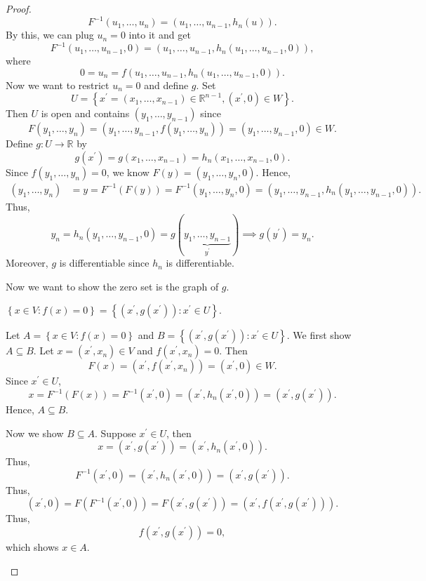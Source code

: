\begin{proof}
    \[
        F^{-1}(u_1, \dots , u_n) = (u_1, \dots , u_{n-1}, h_n(u)).
    \]         
    By this, we can plug \(u_n = 0\) into it and get 
    \[
        F^{-1}(u_1, \dots , u_{n-1}, 0) = (u_1, \dots , u_{n-1}, h_n(u_1, \dots , u_{n-1}, 0)),
    \] 
    where 
    \[
        0 = u_n = f(u_1, \dots , u_{n-1}, h_n(u_1, \dots , u_{n-1}, 0)).
    \]
    Now we want to restrict \(u_n = 0\) and define \(g\). Set 
    \[
        U = \left\{ x^{\prime} = (x_1, \dots , x_{n-1}) \in \mathbb{R} ^{n-1}, (x^{\prime} , 0) \in W \right\}.
    \]  
    Then \(U\) is open and contains \((y_1, \dots , y_{n-1})\) since 
    \[
        F(y_1, \dots , y_n) = (y_1, \dots , y_{n-1}, f(y_1, \dots , y_n)) = (y_1, \dots , y_{n-1}, 0) \in W.
    \]
    Define \(g: U \to \mathbb{R} \) by 
    \[
        g(x^{\prime} ) = g(x_1, \dots , x_{n-1}) = h_n(x_1, \dots , x_{n-1}, 0).
    \]   
    Since \(f(y_1, \dots , y_n) = 0\), we know \(F(y) = (y_1, \dots , y_n, 0)\). Hence,
    \begin{align*}
        (y_1, \dots , y_n) &= y = F^{-1}(F(y)) = F^{-1}(y_1, \dots , y_n, 0) = (y_1, \dots , y_{n-1}, h_n(y_1, \dots , y_{n-1}, 0 ) ).
    \end{align*}  
    Thus,
    \[
        y_n = h_n(y_1, \dots , y_{n-1}, 0) = g(\underbrace{y_1, \dots , y_{n-1}}_{y^{\prime} }) \implies g(y^{\prime} ) = y_n.
    \]
    Moreover, \(g\) is differentiable since \(h_n\) is differentiable. 

    Now we want to show the zero set is the graph of \(g\). 

    \begin{claim}
        \(\left\{ x \in V: f(x) = 0 \right\} = \left\{ (x^{\prime} , g(x^{\prime} )): x^{\prime} \in U \right\}  \). 
    \end{claim}   
    \begin{explanation}
        Let \(A = \left\{ x \in V: f(x) = 0 \right\}\) and \(B = \left\{ (x^{\prime} , g(x^{\prime} )): x^{\prime} \in U \right\}\). We first show \(A \subseteq B\). Let \(x = (x^{\prime} , x_n) \in V\) and \(f(x^{\prime} , x_n) = 0\). Then 
        \[
            F(x) = (x^{\prime} , f(x^{\prime} , x_n)) = (x^{\prime} , 0) \in W.
        \]     
        Since \(x^{\prime} \in U\),
        \[
            x = F^{-1}(F(x)) = F^{-1} (x^{\prime} , 0) = (x^{\prime} , h_n(x^{\prime} , 0)) = (x^{\prime} , g(x^{\prime})).
        \]
        Hence, \(A \subseteq B\).  

        Now we show \(B \subseteq A\). Suppose \(x^{\prime} \in U\), then 
        \[
            x = (x^{\prime} , g(x^{\prime} )) = (x^{\prime} , h_n(x^{\prime} , 0)).
        \]  
        Thus,
        \[
            F^{-1}(x^{\prime} , 0) = (x^{\prime} , h_n(x^{\prime} , 0)) = (x^{\prime} , g(x^{\prime} )).
        \]
        Thus,
        \[
            (x^{\prime} , 0) = F(F^{-1}(x^{\prime} , 0)) = F(x^{\prime} , g(x^{\prime} )) = (x^{\prime} , f(x^{\prime} , g(x^{\prime} ))).
        \]
        Thus,
        \[
            f(x^{\prime} , g(x^{\prime} )) = 0,
        \]
        which shows \(x \in A\). 
    \end{explanation}


\end{proof}
